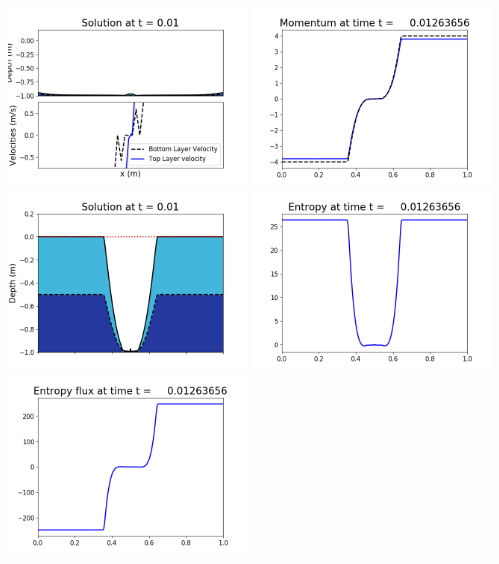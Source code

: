 \documentclass[11pt]{article}
\begin{document}
\includegraphics[width=0.475\textwidth]{frame0079fig1002.png}
\vskip 10pt 
\includegraphics[width=0.475\textwidth]{frame0079fig1003.png}
\includegraphics[width=0.475\textwidth]{frame0079fig1006.png}
\vskip 10pt 
\includegraphics[width=0.475\textwidth]{frame0079fig1007.png}
\includegraphics[width=0.475\textwidth]{frame0079fig1008.png}
\end{document}
